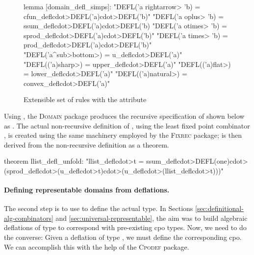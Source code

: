 \begin{figure}
\begin{isacode}
lemma [domain_defl_simps]:
  "DEFL('a \<rightarrow> 'b) = cfun_defl\<cdot>DEFL('a)\<cdot>DEFL('b)"
  "DEFL('a \<oplus> 'b) = ssum_defl\<cdot>DEFL('a)\<cdot>DEFL('b)
  "DEFL('a \<otimes> 'b) = sprod_defl\<cdot>DEFL('a)\<cdot>DEFL('b)"
  "DEFL('a \<times> 'b) = prod_defl\<cdot>DEFL('a)\<cdot>DEFL('b)"
  "DEFL('a\<^sub>\<bottom>) = u_defl\<cdot>DEFL('a)"
  "DEFL(('a)\<sharp>) = upper_defl\<cdot>DEFL('a)"
  "DEFL(('a)\<flat>) = lower_defl\<cdot>DEFL('a)"
  "DEFL(('a)\<natural>) = convex_defl\<cdot>DEFL('a)"
\end{isacode}
\caption{Extensible set of rules with the  attribute}
\label{fig:universal-domain-defl-simps}
\end{figure}

Using , the \textsc{Domain} package produces the recursive specification of  shown below as . The actual non-recursive definition of , using the least fixed point combinator , is created using the same machinery employed by the \textsc{Fixrec} package;  is then derived from the non-recursive definition as a theorem.
%
\begin{isacode}
theorem llist_defl_unfold:
  "llist_defl\<cdot>t = ssum_defl\<cdot>DEFL(one)\<cdot>(sprod_defl\<cdot>(u_defl\<cdot>t)\<cdot>(u_defl\<cdot>(llist_defl\<cdot>t)))"
\end{isacode}

\paragraph{Defining representable domains from deflations.}
%
The second step is to use  to define the actual  type. In Sections \ref{sec:definitional-alg-combinators} and \ref{sec:universal-representable}, the aim was to build algebraic deflations of type  to correspond with pre-existing cpo types. Now, we need to do the converse: Given a deflation of type , we must define the corresponding cpo. We can accomplish this with the help of the \textsc{Cpodef} package.


